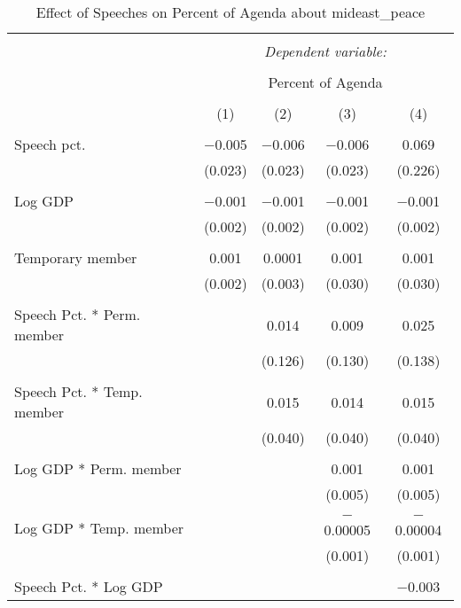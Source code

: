 
\begin{table}[!htbp] \centering 
  \caption{Effect of Speeches on Percent of Agenda about  mideast_peace} 
  \label{} 
\begin{tabular}{@{\extracolsep{5pt}}lcccc} 
\\[-1.8ex]\hline 
\hline \\[-1.8ex] 
 & \multicolumn{4}{c}{\textit{Dependent variable:}} \\ 
\cline{2-5} 
\\[-1.8ex] & \multicolumn{4}{c}{Percent of Agenda} \\ 
\\[-1.8ex] & (1) & (2) & (3) & (4)\\ 
\hline \\[-1.8ex] 
 Speech pct. & $-$0.005 & $-$0.006 & $-$0.006 & 0.069 \\ 
  & (0.023) & (0.023) & (0.023) & (0.226) \\ 
  & & & & \\ 
 Log GDP & $-$0.001 & $-$0.001 & $-$0.001 & $-$0.001 \\ 
  & (0.002) & (0.002) & (0.002) & (0.002) \\ 
  & & & & \\ 
 Temporary member & 0.001 & 0.0001 & 0.001 & 0.001 \\ 
  & (0.002) & (0.003) & (0.030) & (0.030) \\ 
  & & & & \\ 
 Speech Pct. * Perm. member &  & 0.014 & 0.009 & 0.025 \\ 
  &  & (0.126) & (0.130) & (0.138) \\ 
  & & & & \\ 
 Speech Pct. * Temp. member &  & 0.015 & 0.014 & 0.015 \\ 
  &  & (0.040) & (0.040) & (0.040) \\ 
  & & & & \\ 
 Log GDP * Perm. member &  &  & 0.001 & 0.001 \\ 
  &  &  & (0.005) & (0.005) \\ 
  & & & & \\ 
 Log GDP * Temp. member &  &  & $-$0.00005 & $-$0.00004 \\ 
  &  &  & (0.001) & (0.001) \\ 
  & & & & \\ 
 Speech Pct. * Log GDP &  &  &  & $-$0.003 \\ 

\end{tabular}
\end{table}
